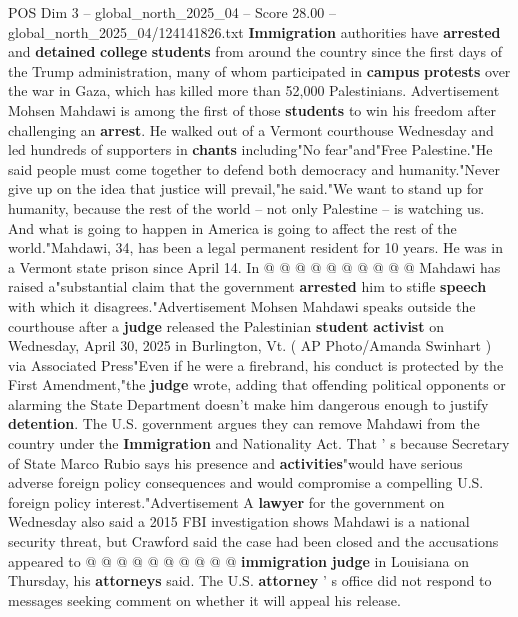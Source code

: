 \begin{textsample}{POS Dim 3 – global\_north\_2025\_04 – Score 28.00 – global\_north\_2025\_04/124141826.txt}  \label{ex:f3_pos_050}
\textbf{Immigration} authorities have \textbf{arrested} and \textbf{detained} \textbf{college} \textbf{students} from around the country since the first days of the Trump administration, many of whom participated in \textbf{campus} \textbf{protests} over the war in Gaza, which has killed more than 52,000 Palestinians.
Advertisement Mohsen Mahdawi is among the first of those \textbf{students} to win his freedom after challenging an \textbf{arrest}.
He walked out of a Vermont courthouse Wednesday and led hundreds of supporters in \textbf{chants} including"No fear"and"Free Palestine."He said people must come together to defend both democracy and humanity."Never give up on the idea that justice will prevail,"he said."We want to stand up for humanity, because the rest of the world -- not only Palestine -- is watching us.
And what is going to happen in America is going to affect the rest of the world."Mahdawi, 34, has been a legal permanent resident for 10 years.
He was in a Vermont state prison since April 14.
In @ @ @ @ @ @ @ @ @ @ Mahdawi has raised a"substantial claim that the government \textbf{arrested} him to stifle \textbf{speech} with which it disagrees."Advertisement Mohsen Mahdawi speaks outside the courthouse after a \textbf{judge} released the Palestinian \textbf{student} \textbf{activist} on Wednesday, April 30, 2025 in Burlington, Vt. ( AP Photo/Amanda Swinhart ) via Associated Press"Even if he were a firebrand, his conduct is protected by the First Amendment,"the \textbf{judge} wrote, adding that offending political opponents or alarming the State Department doesn't make him dangerous enough to justify \textbf{detention}.
The U.S. government argues they can remove Mahdawi from the country under the \textbf{Immigration} and Nationality Act.
That ' s because Secretary of State Marco Rubio says his presence and \textbf{activities}"would have serious adverse foreign policy consequences and would compromise a compelling U.S. foreign policy interest."Advertisement A \textbf{lawyer} for the government on Wednesday also said a 2015 FBI investigation shows Mahdawi is a national security threat, but Crawford said the case had been closed and the accusations appeared to @ @ @ @ @ @ @ @ @ @ \textbf{immigration} \textbf{judge} in Louisiana on Thursday, his \textbf{attorneys} said.
The U.S. \textbf{attorney} ' s office did not respond to messages seeking comment on whether it will appeal his release.

\end{textsample}
